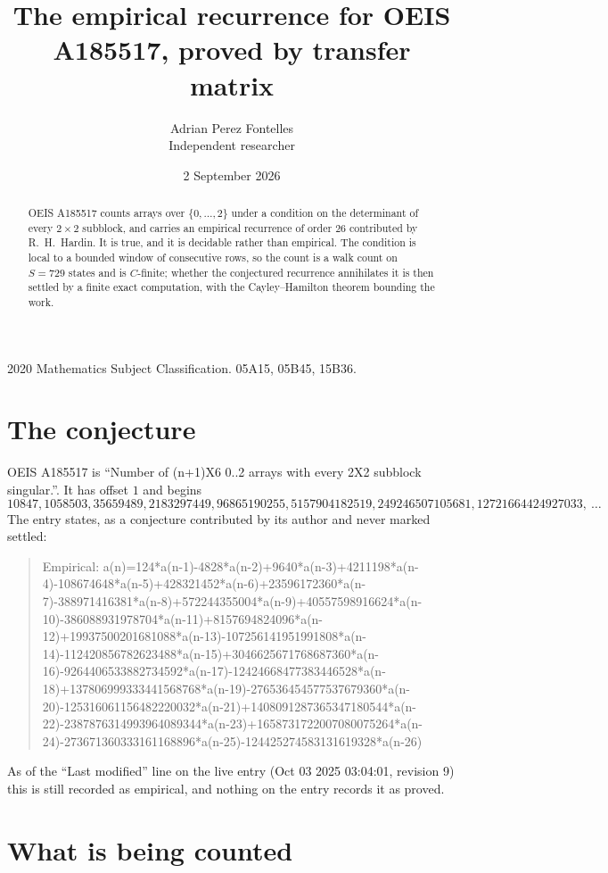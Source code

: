 \documentclass[11pt,a4paper]{article}
\title{The empirical recurrence for OEIS A185517, proved by transfer matrix}
\author{Adrian Perez Fontelles\\ \small Independent researcher}
\date{2 September 2026}
\theoremstyle{plain}
\theoremstyle{definition}
\begin{document}
\maketitle

\begin{abstract}
OEIS A185517 counts arrays over $\{0,\dots,2\}$ under a condition on the determinant of every
$2\times2$ subblock, and carries an empirical recurrence of order $26$ contributed by
R.~H.~Hardin. It is true, and it is decidable rather than empirical. The condition is local to
a bounded window of consecutive rows, so the count is a walk count on $S=729$ states and is
$C$-finite; whether the conjectured recurrence annihilates it is then settled by a finite exact
computation, with the Cayley--Hamilton theorem bounding the work.
\end{abstract}

\noindent\small 2020 Mathematics Subject Classification. 05A15, 05B45, 15B36.\normalsize

\section{The conjecture}

OEIS A185517 is ``Number of (n+1)X6 0..2 arrays with every 2X2 subblock singular.''. It has offset $1$ and begins
\[
10847, 1058503, 35659489, 2183297449, 96865190255, 5157904182519, 249246507105681, 12721664424927033,\ \dots
\]
The entry states, as a conjecture contributed by its author and never marked settled:
\begin{quote}
Empirical: a(n)=124*a(n-1)-4828*a(n-2)+9640*a(n-3)+4211198*a(n-4)-108674648*a(n-5)+428321452*a(n-6)+23596172360*a(n-7)-388971416381*a(n-8)+572244355004*a(n-9)+40557598916624*a(n-10)-386088931978704*a(n-11)+8157694824096*a(n-12)+19937500201681088*a(n-13)-107256141951991808*a(n-14)-112420856782623488*a(n-15)+3046625671768687360*a(n-16)-9264406533882734592*a(n-17)-12424668477383446528*a(n-18)+137806999333441568768*a(n-19)-276536454577537679360*a(n-20)-125316061156482220032*a(n-21)+1408091287365347180544*a(n-22)-2387876314993964089344*a(n-23)+1658731722007080075264*a(n-24)-273671360333161168896*a(n-25)-124425274583131619328*a(n-26)
\end{quote}
As of the ``Last modified'' line on the live entry (Oct 03 2025 03:04:01, revision 9) this is still
recorded as empirical, and nothing on the entry records it as proved.

\section{What is being counted}
\end{document}
